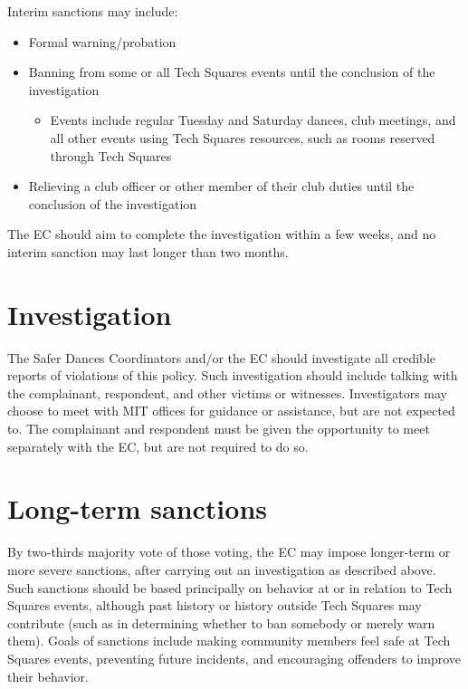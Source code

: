 \documentclass{article}
\begin{document}
Interim sanctions may include:
\begin{itemize}
\item Formal warning/probation
\item Banning from some or all Tech Squares events until the conclusion of the investigation
    \begin{itemize}
    \item Events include regular Tuesday and Saturday dances, club meetings, and all other events using Tech Squares resources, such as rooms reserved through Tech Squares
    \end{itemize}
\item Relieving a club officer or other member of their club duties until the conclusion of the investigation
\end{itemize}

The EC should aim to complete the investigation within a few weeks, and no interim sanction may last longer than two months.


\section{Investigation}

The Safer Dances Coordinators and/or the EC should investigate all credible reports of violations of this policy. Such investigation should include talking with the complainant, respondent, and other victims or witnesses. Investigators may choose to meet with MIT offices for guidance or assistance, but are not expected to. The complainant and respondent must be given the opportunity to meet separately with the EC, but are not required to do so.


\section{Long-term sanctions}

By two-thirds majority vote of those voting, the EC may impose longer-term or more severe sanctions, after carrying out an investigation as described above. Such sanctions should be based principally on behavior at or in relation to Tech Squares events, although past history or history outside Tech Squares may contribute (such as in determining whether to ban somebody or merely warn them). Goals of sanctions include making community members feel safe at Tech Squares events, preventing future incidents, and encouraging offenders to improve their behavior.
\end{document}
